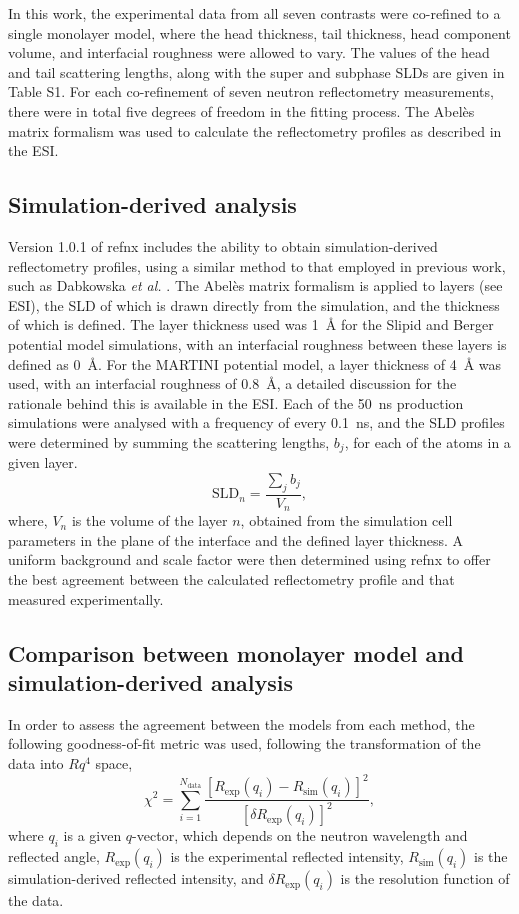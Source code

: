 \documentclass[amsmath,amssymb,twocolumn,superscriptaddress]{revtex4-1}
\begin{document}
In this work, the experimental data from all seven contrasts were co-refined
to a single monolayer model, where the head thickness, tail thickness, head
component volume, and interfacial roughness were allowed to vary.
The values of the head and tail scattering lengths, along with the super and
subphase SLDs are given in Table S1.
For each co-refinement of seven neutron reflectometry measurements, there
were in total five degrees of freedom in the fitting process.
The Abel\`{e}s matrix formalism was used to calculate the reflectometry
profiles as described in the ESI.

\subsection{Simulation-derived analysis}
Version 1.0.1 of refnx \cite{Nelson2018,refnx} includes the ability to
obtain simulation-derived reflectometry profiles, using a similar method to
that employed in previous work, such as
Dabkowska \emph{et al.} \cite{Dabkowska2014}.
The Abel\`{e}s matrix formalism is applied to layers (see ESI), the SLD of
which is drawn directly from the simulation, and the thickness of which is
defined.
The layer thickness used was \SI{1}{\angstrom} for the Slipid and Berger
potential model simulations, with an interfacial roughness between these
layers is defined as \SI{0}{\angstrom}.
For the MARTINI potential model, a layer thickness of \SI{4}{\angstrom} was
used, with an interfacial roughness of \SI{0.8}{\angstrom}, a detailed
discussion for the rationale behind this is available in the ESI.
Each of the \SI{50}{\nano\second} production simulations were analysed with
a frequency of every \SI{0.1}{\nano\second}, and the SLD profiles were
determined by summing the scattering lengths, $b_j$, for each of the atoms
in a given layer.
%
\begin{equation}
  \text{SLD}_n = \frac{\sum_j{b_j}}{V_n},
\end{equation}
%
where, $V_n$ is the volume of the layer $n$, obtained from the simulation
cell parameters in the plane of the interface and the defined layer thickness.
A uniform background and scale factor were then determined using refnx to
offer the best agreement between the calculated reflectometry profile and
that measured experimentally.

\subsection{Comparison between monolayer model and simulation-derived analysis}
\label{sec:para}
In order to assess the agreement between the models from each method, the
following goodness-of-fit metric was used, following the transformation of
the data into $Rq^4$ space,
%
\begin{equation}
  \chi^2 = \sum_{i=1}^{N_{\text{data}}} \frac{[R_{\text{exp}}(q_i) -
  R_{\text{sim}}(q_i)]^2}{[\delta R_{\text{exp}}(q_i)]^2},
\end{equation}
%
where $q_i$ is a given $q$-vector, which depends on the neutron wavelength
and reflected angle, $R_{\text{exp}}(q_i)$ is the experimental reflected
intensity, $R_{\text{sim}}(q_i)$ is the simulation-derived reflected
intensity, and $\delta R_{\text{exp}}(q_i)$ is the resolution function of
the data.
\end{document}
